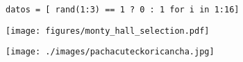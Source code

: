 \documentclass[shownotes,aspectratio=169]{beamer}
\begin{document}
\begin{frame}

\begin{lstlisting}[belowskip=-0.6 \baselineskip]
        datos = [ rand(1:3) == 1 ? 0 : 1 for i in 1:16]
\end{lstlisting}

\pause

\vspace{0.75cm}
\centering
\texttt{[image: figures/monty\_hall\_selection.pdf]} \hspace{1cm}

\end{frame}

 
\begin{frame}[plain]
\centering
  \texttt{[image: ./images/pachacuteckoricancha.jpg]}
\end{frame}
\end{document}
